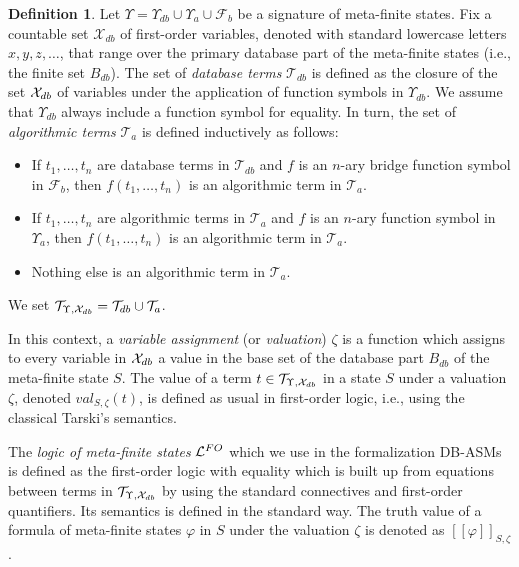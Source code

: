 \documentclass[preprint,11pt]{elsarticle}
\theoremstyle{definition}
\newtheorem{definition}{Definition}[section]
\theoremstyle{remark}
\begin{document}
\begin{definition}\label{termsOfLFO}
Let $\Upsilon = \Upsilon_{db} \cup \Upsilon_a \cup \mathcal{F}_b$ be a signature of meta-finite states. Fix a countable set $\mathcal{X}_{db}$ 
of first-order variables, denoted with standard lowercase letters $x, y, z , \ldots$, that range over the primary database part of the meta-finite states (i.e., the finite set $B_{db}$). The set of \emph{database terms} $\mathcal{T}_{db}$ is defined as the closure of the set ${\cal X}_{db}$ of variables under the application of function symbols in $\Upsilon_{db}$. We assume that $\Upsilon_{db}$ always include a function symbol for equality. In turn, the set of \emph{algorithmic terms} $\mathcal{T}_{a}$ is defined inductively as follows:
\begin{itemize}
\item If $t_1, \ldots, t_n$ are database terms in $\mathcal{T}_{db}$ and $f$ is an $n$-ary bridge function symbol in $\mathcal{F}_b$, then $f(t_1, \ldots, t_n)$ is an algorithmic term in $\mathcal{T}_{a}$. 
\item If $t_1, \ldots, t_n$ are algorithmic terms in $\mathcal{T}_{a}$ and $f$ is an $n$-ary function symbol in $\Upsilon_a$, then $f(t_1, \ldots, t_n)$ is an algorithmic term in $\mathcal{T}_{a}$.
\item Nothing else is an algorithmic term in $\mathcal{T}_{a}$. 
\end{itemize}
We set ${\cal T}_{\Upsilon, {\cal X}_{db}}=\mathcal{T}_{db}\cup\mathcal{T}_{a}$.
\end{definition}


In this context, a \emph{variable assignment} (or \emph{valuation}) $\zeta$ is a function which assigns to every variable in ${\cal X}_{db}$ a value in the base set of the database part $B_{db}$ of the meta-finite state $S$. The  value of a term $t \in {\cal T}_{\Upsilon, {\cal X}_{db}}$ in a state $S$ under a valuation $\zeta$, denoted $\mathit{val}_{S, \zeta}(t)$, is defined as usual in first-order logic, i.e., using the classical Tarski's semantics.


The \emph{logic of meta-finite states} ${\cal L}^{FO}$ which we use in the formalization DB-ASMs is defined as the first-order logic with equality which is built up from equations between terms in ${\cal T}_{\Upsilon, {\cal X}_{db}}$ by using the standard connectives and first-order quantifiers. Its semantics is defined in the standard way. The truth value of a formula of meta-finite states $\varphi$ in $S$ under the valuation $\zeta$ is denoted as $[\![\varphi]\!]_{S,\zeta}$.
\end{document}

